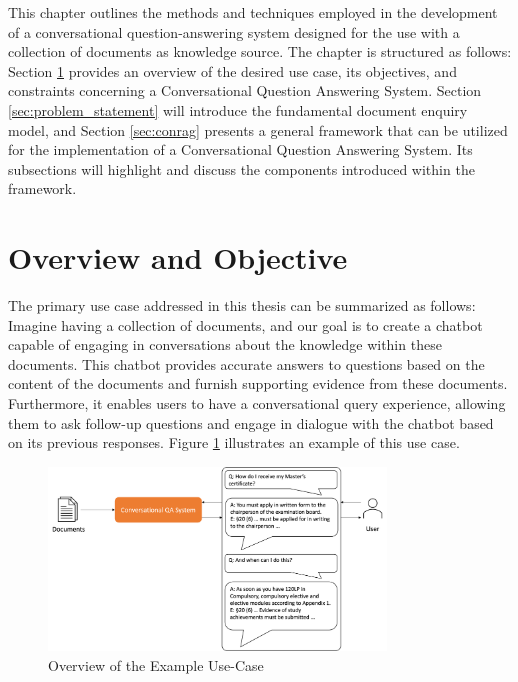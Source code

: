 This chapter outlines the methods and techniques employed in the development of a conversational question-answering system designed for the use with a collection of documents as knowledge source. The chapter is structured as follows: Section \ref{sec:overview} provides an overview of the desired use case, its objectives, and constraints concerning a Conversational Question Answering System. Section \ref{sec:problem_statement} will introduce the fundamental document enquiry model, and Section \ref{sec:conrag} presents a general framework that can be utilized for the implementation of a Conversational Question Answering System. Its subsections will highlight and discuss the components introduced within the framework.

\section{Overview and Objective}
\label{sec:overview}

The primary use case addressed in this thesis can be summarized as follows: Imagine having a collection of documents, and our goal is to create a chatbot capable of engaging in conversations about the knowledge within these documents. This chatbot provides accurate answers to questions based on the content of the documents and furnish supporting evidence from these documents. Furthermore, it enables users to have a conversational query experience, allowing them to ask follow-up questions and engage in dialogue with the chatbot based on its previous responses. Figure \ref{fig:use-case} illustrates an example of this use case.

\begin{figure}
    \centering
    \includegraphics[width=0.8\textwidth]{Grafiken/Use_Case.png}
    \caption{Overview of the Example Use-Case}
    \label{fig:use-case}
\end{figure}

